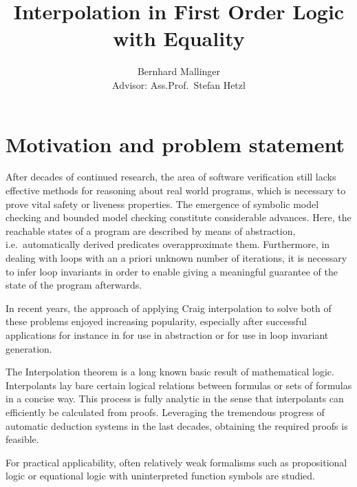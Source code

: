 \documentclass[,%
			paper=a4,%
			DIV12,
			liststotoc,
			bibtotoc,
			draft=false,%
			numbers=noendperiod
			]{scrartcl}
\title{Interpolation in First Order Logic with Equality}
\author{Bernhard Mallinger \medskip \\
Advisor: Ass.Prof.\ Stefan Hetzl}
\theoremstyle{definition}
\begin{document}
\maketitle

\section{Motivation and problem statement}
\label{motivation}

After decades of continued research, the area of software verification still lacks effective methods for reasoning about real world programs, which is necessary to prove vital safety or liveness properties.
The emergence of symbolic model checking and bounded model checking constitute considerable advances.
Here, the reachable states of a program are described by means of abstraction, i.e.\ automatically derived predicates overapproximate them. 
Furthermore, in dealing with loops with an a priori unknown number of iterations, it is necessary to infer loop invariants in order to enable giving a meaningful guarantee of the state of the program afterwards.

In recent years, the approach of applying Craig interpolation to solve both of these problems enjoyed increasing popularity, especially after successful applications for instance in \cite{McMillan03} for use in abstraction or \cite{weissenbacher2010} for use in loop invariant generation.

The Interpolation theorem is a long known basic result of mathematical logic.
Interpolants lay bare certain logical relations between formulas or sets of formulas in a concise way. 
This process is fully analytic in the sense that interpolants can efficiently be calculated from proofs.
Leveraging the tremendous progress of automatic deduction systems in the last decades, obtaining the required proofs is feasible.

For practical applicability, often relatively weak formalisms such as propositional logic or equational logic with uninterpreted function symbols are studied. 





\begin{comment}
Software verification
Model checking
Derive invariants
interpolation by its nature disregards all but the predicates relevant to a certain property
can be used for predicate refinement in cegar

often restricted to weaker logics, application to more powerful formalisms such as fol with equality is relevant 
\end{comment}
\end{document}
